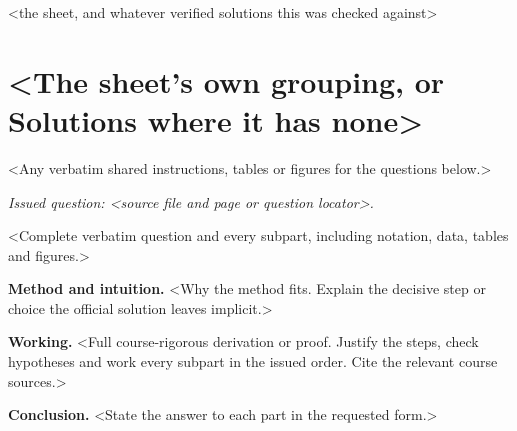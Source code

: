 \documentclass[a4paper,10pt]{article}
\begin{document}
%
  {<the sheet, and whatever verified solutions this was checked against>}

\section{<The sheet's own grouping, or Solutions where it has none>}

<Any verbatim shared instructions, tables or figures for the questions below.>

\noindent\emph{Issued question: <source file and page or question locator>.}
\begin{question}
<Complete verbatim question and every subpart, including notation, data, tables and figures.>
\end{question}

\begin{solution}
\par\textbf{Method and intuition.}
<Why the method fits. Explain the decisive step or choice the official solution leaves implicit.>
\par\textbf{Working.}
<Full course-rigorous derivation or proof. Justify the steps, check hypotheses and work every
subpart in the issued order. Cite the relevant course sources.>
\par\textbf{Conclusion.}
<State the answer to each part in the requested form.>
\end{solution}
\end{document}
